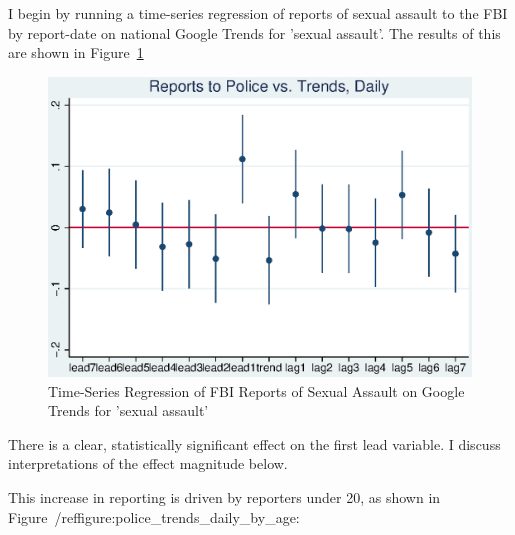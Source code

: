 \documentclass[AER,draftmode]{AEA}
\begin{document}
I begin by running a time-series regression of reports of sexual assault to the FBI by report-date on national Google Trends for 'sexual assault'. The results of this are shown in Figure~\ref{figure:police_trends_daily}

\begin{figure}
\includegraphics[]{figures/police_trend_daily.eps}
\caption{Time-Series Regression of FBI Reports of Sexual Assault on Google Trends for 'sexual assault'} \label{figure:police_trends_daily}
\end{figure}

There is a clear, statistically significant effect on the first lead variable.  I discuss interpretations of the effect magnitude below. 

This increase in reporting is driven by reporters under 20, as shown in Figure~/ref{figure:police_trends_daily_by_age}:
\end{document}
